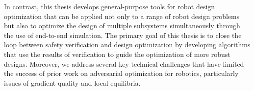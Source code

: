 In contrast, this thesis develops general-purpose tools for robot design optimization that can be applied not only to a range of robot design problems but also to optimize the design of multiple subsystems simultaneously through the use of end-to-end simulation. The primary goal of this thesis is to close the loop between safety verification and design optimization by developing algorithms that use the results of verification to guide the optimization of more robust designs. Moreover, we address several key technical challenges that have limited the success of prior work on adversarial optimization for robotics, particularly issues of gradient quality and local equilibria.